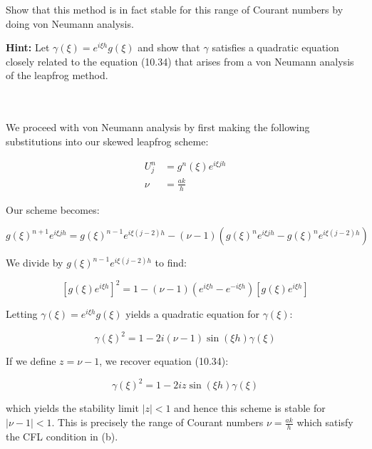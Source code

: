 Show that this method is in fact stable for this range of Courant numbers by doing von Neumann analysis.

\textbf{Hint:} Let $\gamma(\xi) = e^{i \xi h} g(\xi)$ and show that $\gamma$ satisfies a quadratic equation closely
related to the equation (10.34) that arises from a von Neumann analysis of the leapfrog method.

\begin{solution}\ \\\\
    We proceed with von Neumann analysis by first making the following substitutions into our skewed leapfrog scheme:

    \begin{align*}
        U_j^n &= g^n(\xi) e^{i \xi jh} \\
        \nu &= \frac{ak}{h}
    \end{align*}

    Our scheme becomes:

    $$
    g(\xi)^{n+1} e^{i \xi jh} = g(\xi)^{n-1} e^{i \xi (j-2) h} - (\nu - 1) \left(g(\xi)^{n} e^{i \xi jh} - g(\xi)^{n} e^{i \xi (j-2) h}\right)
    $$

    We divide by $g(\xi)^{n-1} e^{i \xi (j-2) h}$ to find:

    $$
    \left[g(\xi) e^{i \xi h} \right]^2 = 1 - (\nu - 1)\left(e^{i \xi h} - e^{-i \xi h} \right)\left[ g(\xi) e^{i \xi h} \right]
    $$

    Letting $\gamma(\xi) = e^{i \xi h}g(\xi)$ yields a quadratic equation for $\gamma(\xi)$:

    $$
    \gamma(\xi)^2 = 1 - 2i(\nu - 1)\sin{(\xi h)}\gamma(\xi)
    $$
   
    If we define $z = \nu - 1$, we recover equation (10.34):

    $$
    \gamma(\xi)^2 = 1 - 2iz\sin{(\xi h)}\gamma(\xi)
    $$

    which yields the stability limit $|z| < 1$ and hence this scheme is stable for \linebreak
    $|\nu - 1| < 1$. This is precisely the range of Courant numbers $\nu = \frac{ak}{h}$ which satisfy the CFL condition
    in (b).
    \ \\
\end{solution}